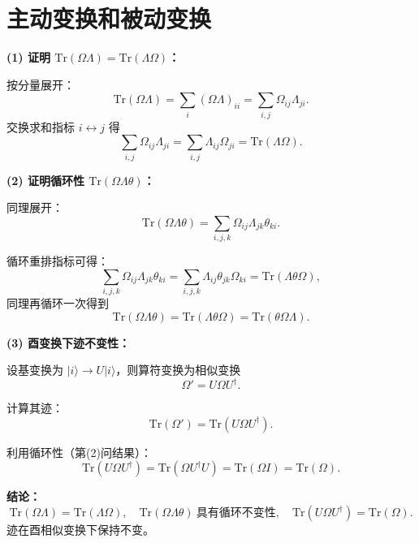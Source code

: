 ﻿%
\section{主动变换和被动变换}

\begin{solution}[迹的性质与酉变换不变性]

\answer

\textbf{(1) 证明 $\mathrm{Tr}(\Omega\Lambda)=\mathrm{Tr}(\Lambda\Omega)$：}

按分量展开：
\[
\mathrm{Tr}(\Omega\Lambda)=\sum_i (\Omega\Lambda)_{ii}
=\sum_{i,j}\Omega_{ij}\Lambda_{ji}.
\]
交换求和指标 $i\leftrightarrow j$ 得
\[
\sum_{i,j}\Omega_{ij}\Lambda_{ji}
=\sum_{i,j}\Lambda_{ij}\Omega_{ji}
=\mathrm{Tr}(\Lambda\Omega).
\]

\textbf{(2) 证明循环性 $\mathrm{Tr}(\Omega\Lambda\theta)$：}

同理展开：
\[
\mathrm{Tr}(\Omega\Lambda\theta)
=\sum_{i,j,k}\Omega_{ij}\Lambda_{jk}\theta_{ki}.
\]

循环重排指标可得：
\[
\sum_{i,j,k}\Omega_{ij}\Lambda_{jk}\theta_{ki}
=\sum_{i,j,k}\Lambda_{ij}\theta_{jk}\Omega_{ki}
=\mathrm{Tr}(\Lambda\theta\Omega),
\]
同理再循环一次得到
\[
\mathrm{Tr}(\Omega\Lambda\theta)=\mathrm{Tr}(\Lambda\theta\Omega)=\mathrm{Tr}(\theta\Omega\Lambda).
\]


\textbf{(3) 酉变换下迹不变性：}

设基变换为 $|i\rangle \to U|i\rangle$，则算符变换为相似变换
\[
\Omega' = U\Omega U^\dagger.
\]

计算其迹：
\[
\mathrm{Tr}(\Omega')=\mathrm{Tr}(U\Omega U^\dagger).
\]

利用循环性（第(2)问结果）：
\[
\mathrm{Tr}(U\Omega U^\dagger)
=\mathrm{Tr}(\Omega U^\dagger U)
=\mathrm{Tr}(\Omega I)
=\mathrm{Tr}(\Omega).
\]

\textbf{结论：}
\[
\mathrm{Tr}(\Omega\Lambda)=\mathrm{Tr}(\Lambda\Omega),\quad
\mathrm{Tr}(\Omega\Lambda\theta)\ \text{具有循环不变性},\quad
\mathrm{Tr}(U\Omega U^\dagger)=\mathrm{Tr}(\Omega).
\]
迹在酉相似变换下保持不变。
\end{solution}


